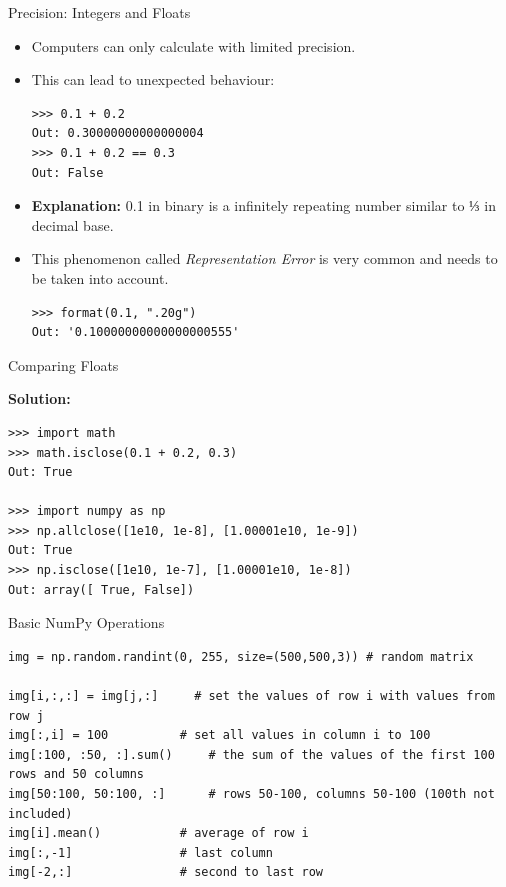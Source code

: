 \documentclass[compress%
,aspectratio=169%
]{beamer}
\begin{document}
\begin{frame}[fragile]{Precision: Integers and Floats}

\begin{itemize}
    \item Computers can only calculate with limited precision.
    \item This can lead to unexpected behaviour:
\begin{lstlisting}
>>> 0.1 + 0.2
Out: 0.30000000000000004
>>> 0.1 + 0.2 == 0.3
Out: False
\end{lstlisting}
\end{itemize}

\begin{itemize}
    \item \textbf{Explanation:} 0.1 in binary is a infinitely repeating number similar to ⅓ in decimal base.
    \item This phenomenon called \textit{Representation Error} is very common and needs to be taken into account.
\begin{lstlisting}
>>> format(0.1, ".20g")
Out: '0.10000000000000000555'
\end{lstlisting}    
\end{itemize}

\end{frame}

\begin{frame}[fragile]{Comparing Floats}
    
\textbf{Solution:}
\begin{lstlisting}
>>> import math
>>> math.isclose(0.1 + 0.2, 0.3)
Out: True

>>> import numpy as np
>>> np.allclose([1e10, 1e-8], [1.00001e10, 1e-9])
Out: True
>>> np.isclose([1e10, 1e-7], [1.00001e10, 1e-8])
Out: array([ True, False])
\end{lstlisting}



\end{frame}

\begin{frame}[fragile]{Basic NumPy Operations}
\begin{lstlisting}
img = np.random.randint(0, 255, size=(500,500,3)) # random matrix

img[i,:,:] = img[j,:]     # set the values of row i with values from row j
img[:,i] = 100          # set all values in column i to 100
img[:100, :50, :].sum()     # the sum of the values of the first 100 rows and 50 columns
img[50:100, 50:100, :]      # rows 50-100, columns 50-100 (100th not included)
img[i].mean()           # average of row i
img[:,-1]               # last column
img[-2,:]               # second to last row

\end{lstlisting}
\end{frame}
\end{document}
